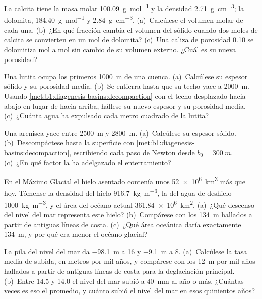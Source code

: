 \begin{exercise}[$\star$]\label{exo:b1:diagenesis-basins:4}
La calcita tiene la masa molar \qty{100.09}{g.mol^{-1}} y la densidad \qty{2.71}{g.cm^{-3}}; la dolomita, \qty{184.40}{g.mol^{-1}} y \qty{2.84}{g.cm^{-3}}. (a)~Calcúlese el volumen molar de cada una.
(b)~¿En qué fracción cambia el volumen del sólido cuando dos moles de calcita se convierten en un mol de dolomita? (c)~Una caliza de porosidad \num{0.10} se dolomitiza mol a mol sin cambio de su
volumen externo. ¿Cuál es su nueva porosidad?
\end{exercise}

\begin{exercise}[$\star\star$]\label{exo:b1:diagenesis-basins:5}
Una lutita ocupa los primeros \qty{1000}{m} de una cuenca. (a)~Calcúlese su espesor sólido y su porosidad media. (b)~Se entierra hasta que su techo yace a \qty{2000}{m}. Usando
\cref{met:b1:diagenesis-basins:decompaction} con el techo desplazado hacia abajo en lugar de hacia arriba, hállese su nuevo espesor y su porosidad media. (c)~¿Cuánta agua ha
expulsado cada metro cuadrado de la lutita?
\end{exercise}

\begin{exercise}[$\star\star$]\label{exo:b1:diagenesis-basins:6}
Una arenisca yace entre \qty{2500}{m} y \qty{2800}{m}. (a)~Calcúlese su espesor sólido. (b)~Descompáctese hasta la superficie con \cref{met:b1:diagenesis-basins:decompaction}, escribiendo
cada paso de Newton desde $b_0 = \qty{300}{m}$. (c)~¿En qué factor la ha adelgazado el enterramiento?
\end{exercise}

\begin{exercise}[$\star\star$]\label{exo:b1:diagenesis-basins:7}
En el Máximo Glacial el hielo asentado contenía unos \qty{52e6}{km^3} más que hoy. Tómense la densidad del hielo \qty{916.7}{kg.m^{-3}}, la del agua de deshielo \qty{1000}{kg.m^{-3}}, y el
área del océano actual \qty{361.84e6}{km^2}. (a)~¿Qué descenso del nivel del mar representa este hielo? (b)~Compárese con los \qty{134}{m} hallados a partir de antiguas líneas de costa.
(c)~¿Qué área oceánica daría exactamente \qty{134}{m}, y por qué era menor el océano glacial?
\end{exercise}

\begin{exercise}[$\star\star$]\label{exo:b1:diagenesis-basins:8}
La pila del nivel del mar da \qty{-98.1}{m} a \qty{16}{\ka} y \qty{-9.1}{m} a \qty{8}{\ka}. (a)~Calcúlese la tasa media de subida, en metros por mil años, y compárese con los \qty{12}{m} por mil
años hallados a partir de antiguas líneas de costa para la deglaciación principal. (b)~Entre \qty{14.5}{\ka} y \qty{14.0}{\ka} el nivel del mar subió a \qty{40}{mm} al año o más. ¿Cuántas veces es eso el
promedio, y cuánto subió el nivel del mar en esos quinientos años?
\end{exercise}

